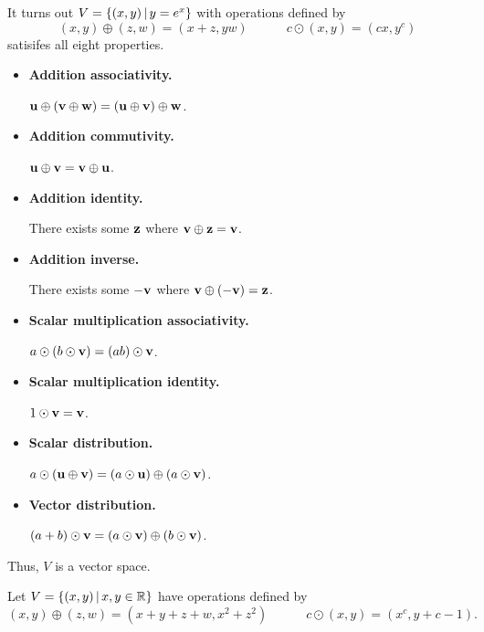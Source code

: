 \begin{applicationActivities}
\begin{remark}
  It turns out \(V=\left\{(x,y)\,\middle|\,y=e^x\right\}\) with operations defined by
  \[
    (x,y)\oplus (z,w)=(x+z,yw)
      \hspace{3em}
    c\odot (x,y)=(cx,y^c)
  \]
  satisifes all eight properties.
    \begin{multicols}{2}
    \begin{itemize}
      \item \textbf{Addition associativity.}

            \(\mathbf u\oplus(\mathbf v\oplus\mathbf w)=
            (\mathbf u\oplus\mathbf v)\oplus\mathbf w\).
      \item \textbf{Addition commutivity.}

            \(\mathbf u\oplus\mathbf v=
            \mathbf v\oplus\mathbf u\).
      \item \textbf{Addition identity.}

            There exists some \(\mathbf z\)
            where \(\mathbf v\oplus\mathbf z=\mathbf v\).
      \item \textbf{Addition inverse.}

            There exists some \(-\mathbf v\)
            where \(\mathbf v\oplus(-\mathbf v)=\mathbf z\).
      \item \textbf{Scalar multiplication associativity.}

            \(a\odot(b\odot\mathbf v)=(ab)\odot\mathbf v\).
      \item \textbf{Scalar multiplication identity.}

            \(1\odot\mathbf v=\mathbf v\).
      \item \textbf{Scalar distribution.}

            \(a\odot(\mathbf u\oplus\mathbf v)=
            (a\odot\mathbf u)\oplus (a\odot\mathbf v)\).
      \item \textbf{Vector distribution.}

            \((a+b)\odot\mathbf v=(a\odot\mathbf v)\oplus (b\odot\mathbf v)\).
    \end{itemize}
    \end{multicols}
	Thus, \(V\) is a vector space.
\end{remark}





\begin{activity}{15}
  Let \(V=\left\{(x,y)\,\middle|\,x,y\in\mathbb{R}\right\}\) have operations defined by
  \[
    (x,y)\oplus (z,w)=(x+y+z+w,x^2+z^2)
      \hspace{3em}
    c\odot (x,y)=(x^c,y+c-1)
  .\]


\end{activity}
\end{applicationActivities}
